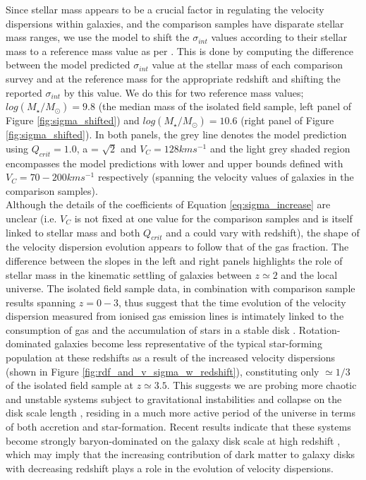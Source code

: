 \documentclass[fleqn,usenatbib]{mnras}
\begin{document}
Since stellar mass appears to be a crucial factor in regulating the velocity dispersions within galaxies, and the comparison samples have disparate stellar mass ranges, we use the model to shift the $\sigma_{int}$ values according to their stellar mass to a reference mass value as per \cite{Wisnioski2015}.
This is done by computing the difference between the model predicted $\sigma_{int}$ value at the stellar mass of each comparison survey and at the reference mass for the appropriate redshift and shifting the reported $\sigma_{int}$ by this value.
We do this for two reference mass values; $log(M_{\star}/M_{\odot}) = 9.8$ (the median mass of the isolated field sample, left panel of Figure \ref{fig:sigma_shifted}) and $log(M_{\star}/M_{\odot}) = 10.6$ (right panel of Figure \ref{fig:sigma_shifted}).
In both panels, the grey line denotes the model prediction using $Q_{crit} = 1.0$, a = $\sqrt{2}$ and $V_{C} = 128kms^{-1}$ and the light grey shaded region encompasses the model predictions with lower and upper bounds defined with $V_{C} = 70-200kms^{-1}$ respectively (spanning the velocity values of galaxies in the comparison samples). \\

Although the details of the coefficients of Equation \ref{eq:sigma_increase} are unclear (i.e. $V_{C}$ is not fixed at one value for the comparison samples and is itself linked to stellar mass and both $Q_{crit}$ and a could vary with redshift), the shape of the velocity dispersion evolution appears to follow that of the gas fraction.
The difference between the slopes in the left and right panels highlights the role of stellar mass in the kinematic settling of galaxies between $z\simeq2$ and the local universe. 
The isolated field sample data, in combination with comparison sample results spanning $z=0-3$, thus suggest that the time evolution of the velocity dispersion measured from ionised gas emission lines is intimately linked to the consumption of gas and the accumulation of stars in a stable disk \citep[e.g.][]{Law2009,Law2012b,Law2012c,Wisnioski2015}.
Rotation-dominated galaxies become less representative of the typical star-forming population at these redshifts as a result of the increased velocity dispersions (shown in Figure \ref{fig:rdf_and_v_sigma_w_redshift}), constituting only $\simeq1/3$ of the isolated field sample at $z\simeq3.5$.
This suggests we are probing more chaotic and unstable systems subject to gravitational instabilities and collapse on the disk scale length \citep{Burkert2010,Genzel2011}, residing in a much more active period of the universe in terms of both accretion and star-formation.
Recent results indicate that these systems become strongly baryon-dominated on the galaxy disk scale at high redshift \citep{Ubler2017,Lang2017,Genzel2017}, which may imply that the increasing contribution of dark matter to galaxy disks with decreasing redshift plays a role in the evolution of velocity dispersions.   
\end{document}
